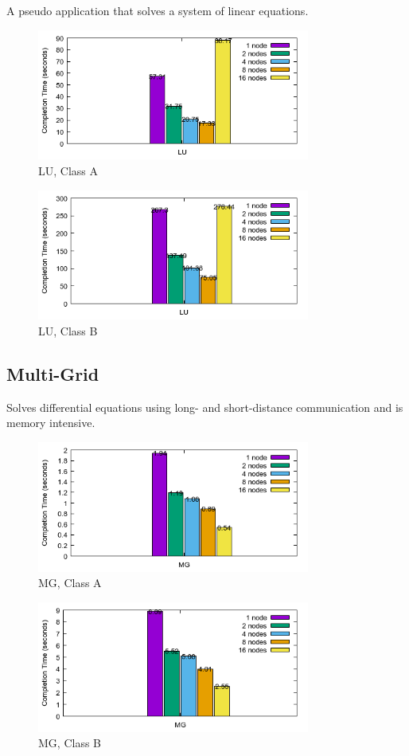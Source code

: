\documentclass[a4paper]{article}
\begin{document}
A pseudo application that solves a system of linear equations.

\begin{figure}[H]
\centering
\includegraphics[width=0.8\textwidth]{figures/LUvA.png}
\caption{\label{fig:LUvA}LU, Class A}
\end{figure}

\begin{figure}[H]
\centering
\includegraphics[width=0.8\textwidth]{figures/LUvB.png}
\caption{\label{fig:LUvB}LU, Class B}
\end{figure}

\subsection{Multi-Grid}

Solves differential equations using long- and short-distance communication and is memory intensive.

\begin{figure}[H]
\centering
\includegraphics[width=0.8\textwidth]{figures/MGvA.png}
\caption{\label{fig:MGvA}MG, Class A}
\end{figure}

\begin{figure}[H]
\centering
\includegraphics[width=0.8\textwidth]{figures/MGvB.png}
\caption{\label{fig:MGvB}MG, Class B}
\end{figure}



\end{document}
